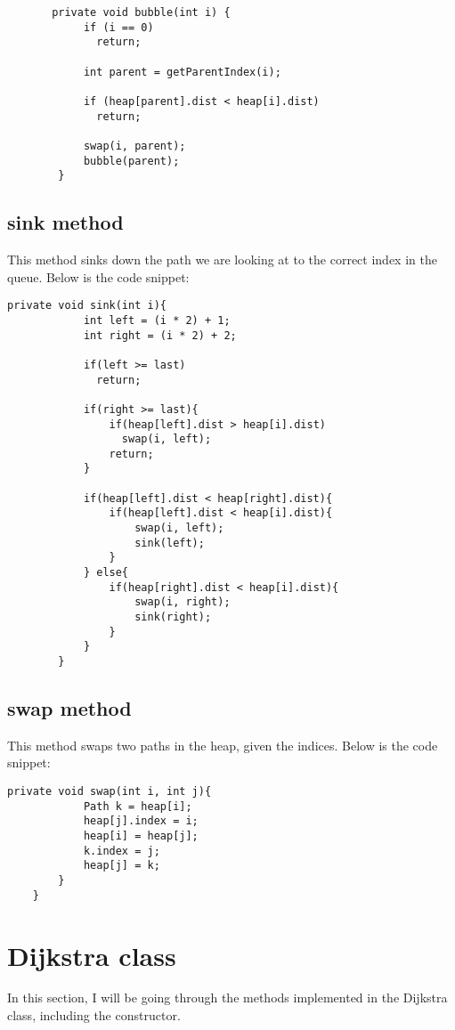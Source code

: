 \documentclass[a4paper,11pt]{article}
\begin{document}
\begin{verbatim}
       private void bubble(int i) {
            if (i == 0)
              return;
        
            int parent = getParentIndex(i);
        
            if (heap[parent].dist < heap[i].dist)
              return;
        
            swap(i, parent);
            bubble(parent);
        }
\end{verbatim}

\subsection*{sink method}
This method sinks down the path we are looking at to the correct index in the queue. Below is the code snippet:

\begin{verbatim}
private void sink(int i){
            int left = (i * 2) + 1;
            int right = (i * 2) + 2;

            if(left >= last)
              return;

            if(right >= last){
                if(heap[left].dist > heap[i].dist)
                  swap(i, left);
                return;
            }

            if(heap[left].dist < heap[right].dist){
                if(heap[left].dist < heap[i].dist){
                    swap(i, left);
                    sink(left);
                }
            } else{
                if(heap[right].dist < heap[i].dist){
                    swap(i, right);
                    sink(right);
                }
            }
        }
\end{verbatim}

\subsection*{swap method}
This method swaps two paths in the heap, given the indices. Below is the code snippet:

\begin{verbatim}
private void swap(int i, int j){
            Path k = heap[i];
            heap[j].index = i;
            heap[i] = heap[j];
            k.index = j;
            heap[j] = k;
        }
    }
\end{verbatim}


\section*{Dijkstra class}
In this section, I will be going through the methods implemented in the Dijkstra class, including the constructor.
\end{document}
